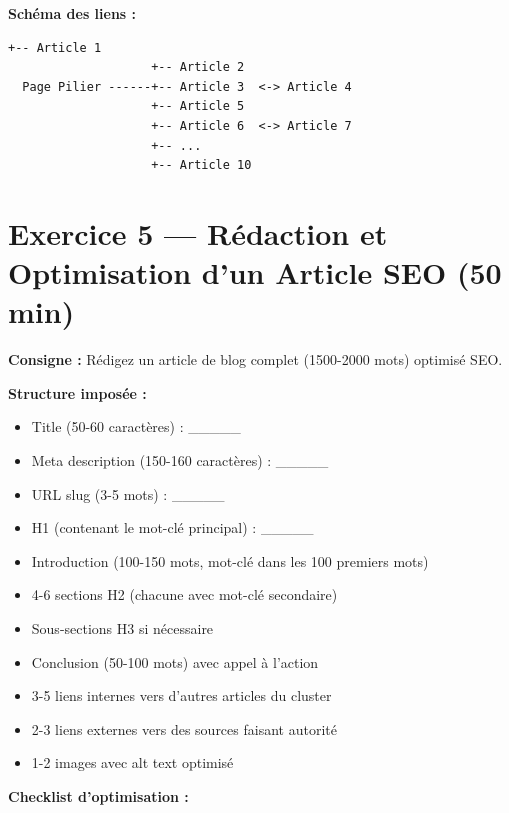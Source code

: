 \documentclass[12pt,a4paper]{report}
\begin{document}
\textbf{Schéma des liens :}
\begin{lstlisting}[basicstyle=\ttfamily\small]
                    +-- Article 1
                    +-- Article 2
  Page Pilier ------+-- Article 3  <-> Article 4
                    +-- Article 5
                    +-- Article 6  <-> Article 7
                    +-- ...
                    +-- Article 10
\end{lstlisting}

\section{Exercice 5 --- Rédaction et Optimisation d'un Article SEO (50 min)}

\textbf{Consigne :} Rédigez un article de blog complet (1500-2000 mots) optimisé SEO.

\textbf{Structure imposée :}
\begin{itemize}
\item Title (50-60 caractères) : \_\_\_\_\_
\item Meta description (150-160 caractères) : \_\_\_\_\_
\item URL slug (3-5 mots) : \_\_\_\_\_
\item H1 (contenant le mot-clé principal) : \_\_\_\_\_
\item Introduction (100-150 mots, mot-clé dans les 100 premiers mots)
\item 4-6 sections H2 (chacune avec mot-clé secondaire)
\item Sous-sections H3 si nécessaire
\item Conclusion (50-100 mots) avec appel à l'action
\item 3-5 liens internes vers d'autres articles du cluster
\item 2-3 liens externes vers des sources faisant autorité
\item 1-2 images avec alt text optimisé
\end{itemize}

\textbf{Checklist d'optimisation :}
\end{document}
